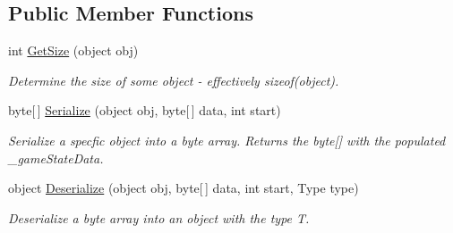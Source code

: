 \subsection*{Public Member Functions}
\begin{DoxyCompactItemize}
\item 
int \hyperlink{class_skyrates_1_1_util_1_1_serializing_1_1_bit_serialize_attribute_1_1_serialization_module_3_01_t_01_4_af4afbffb74489fa954ff6da86463119e}{Get\-Size} (object obj)
\begin{DoxyCompactList}\small\item\em Determine the size of some object -\/ effectively sizeof(object). \end{DoxyCompactList}\item 
byte\mbox{[}$\,$\mbox{]} \hyperlink{class_skyrates_1_1_util_1_1_serializing_1_1_bit_serialize_attribute_1_1_serialization_module_3_01_t_01_4_a7acae741ac63e5c8553c17a2f09ed052}{Serialize} (object obj, byte\mbox{[}$\,$\mbox{]} data, int start)
\begin{DoxyCompactList}\small\item\em Serialize a specfic object into a byte array. Returns the byte\mbox{[}\mbox{]} with the populated \-\_\-game\-State\-Data. \end{DoxyCompactList}\item 
object \hyperlink{class_skyrates_1_1_util_1_1_serializing_1_1_bit_serialize_attribute_1_1_serialization_module_3_01_t_01_4_ad46c1938a2ab2b9b750e497f1ac2dd9d}{Deserialize} (object obj, byte\mbox{[}$\,$\mbox{]} data, int start, Type type)
\begin{DoxyCompactList}\small\item\em Deserialize a byte array into an object with the type T. \end{DoxyCompactList}\end{DoxyCompactItemize}
